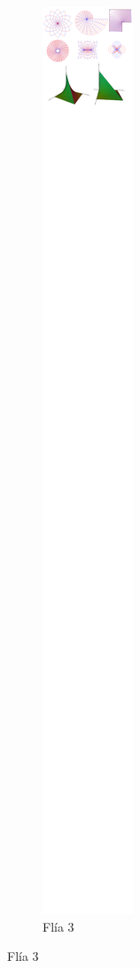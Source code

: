 \begin{figure}[t!]
\begin{subfigure}[t]{0.5\textwidth}
\centering
\includegraphics[scale=0.5,trim={744px 9900px 5px 24px},clip]{images/04_analisis2/am2.png}
\caption{Flía 3}
\end{subfigure}%

\end{figure}
